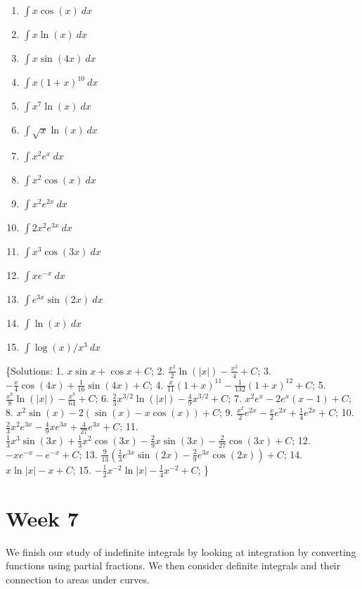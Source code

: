 \documentclass[
  11pt,
  oneside]{book}
\providecommand{\tightlist}{%
  \setlength{\itemsep}{0pt}\setlength{\parskip}{0pt}}
\newcommand{\slide}{}
\theoremstyle{definition}
\theoremstyle{definition}
\theoremstyle{definition}
\theoremstyle{definition}
\theoremstyle{remark}
\begin{document}
\begin{enumerate}
\def\labelenumi{\arabic{enumi}.}
\tightlist
\item
  \(\int x\cos(x)\ dx\)
\item
  \(\int x\ln(x)\ dx\)
\item
  \(\int x\sin(4x)\ dx\)
\item
  \(\int x(1+x)^{10}\ dx\)
\item
  \(\int x^7\ln(x)\ dx\)
\item
  \(\int \sqrt{x}\ln(x)\ dx\)
\item
  \(\int x^2e^x\ dx\)
\item
  \(\int x^2\cos(x)\ dx\)
\item
  \(\int x^2e^{2x}\ dx\)
\item
  \(\int 2x^2e^{3x}\ dx\)
\item
  \(\int x^3\cos(3x)\ dx\)
\item
  \(\int xe^{-x}\ dx\)
\item
  \(\int e^{3x}\sin(2x)\ dx\)
\item
  \(\int \ln(x)\ dx\)
\item
  \(\int \log(x)/x^3\ dx\)
\end{enumerate}

\{Solutions:
1. \(x\sin x+\cos x + C\);
2. \(\frac{x^2}{2}\ln(|x|) - \frac{x^2}{4}+C\);
3. \(-\frac{x}{4}\cos(4x)+\frac{1}{16}\sin(4x)+C\);
4. \(\frac{x}{11}(1+x)^{11} - \frac{1}{132}(1+x)^{12}+C\);
5. \(\frac{x^8}{8}\ln(|x|) - \frac{x^8}{64}+C\);
6. \(\frac{2}{3}x^{3/2}\ln(|x|) - \frac{4}{9}x^{3/2}+C\);
7. \(x^2e^x - 2e^x(x-1)+C\);
8. \(x^2\sin(x) - 2(\sin(x)-x\cos(x))+C\);
9. \(\frac{x^2}{2}e^{2x}-\frac{x}{2}e^{2x}+\frac{1}{4}e^{2x}+C\);
10. \(\frac{2}{3}x^2e^{3x}-\frac{4}{9}xe^{3x}+\frac{4}{27}e^{3x}+C\);
11. \(\frac{1}{3}x^3\sin(3x)+\frac{1}{3}x^2\cos(3x)-\frac{2}{9}x\sin(3x)-\frac{2}{27}\cos(3x)+C\);
12. \(-xe^{-x}-e^{-x}+C\);
13. \(\frac{9}{13}\left( \frac{1}{3}e^{3x}\sin(2x)-\frac{2}{9}e^{3x}\cos(2x) \right)+C\);
14. \(x\ln|x| - x +C\);
15. \(-\frac{1}{2}x^{-2}\ln|x| - \frac{1}{4}x^{-2} + C\);
\}

\chapter{Week 7}\label{week-seven}

We finish our study of indefinite integrals by looking at integration by converting functions using partial fractions. We then consider definite integrals and their connection to areas under curves.
\slide
\end{document}
